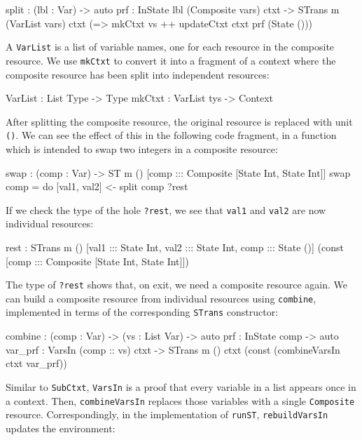 \small
\begin{code}
split : (lbl : Var) -> {auto prf : InState lbl (Composite vars) ctxt} ->
        STrans m (VarList vars) ctxt 
                 (\vs => mkCtxt vs ++ updateCtxt ctxt prf (State ()))
\end{code}
\normalsize

A \texttt{VarList} is a list of variable names, one for each resource
in the composite resource. We use \texttt{mkCtxt} to convert it into
a fragment of a context where the composite resource has been split into
independent resources:
  
\small
\begin{code}
VarList : List Type -> Type
mkCtxt : VarList tys -> Context
\end{code}
\normalsize

After splitting the composite resource, the original resource is replaced with
unit \texttt{()}. We can see the effect of this in the following code fragment,
in a function which is intended to swap two integers in a composite resource:

\small
\begin{code}
swap : (comp : Var) -> ST m () [comp ::: Composite [State Int, State Int]]
swap comp = do [val1, val2] <- split comp
               ?rest
\end{code}
\normalsize

If we check the type of the hole \texttt{?rest}, we see that \texttt{val1}
and \texttt{val2} are now individual resources:

\small
\begin{code}
rest : STrans m () [val1 ::: State Int, val2 ::: State Int, comp ::: State ()]
            (const [comp ::: Composite [State Int, State Int]])
\end{code}
\normalsize

The type of \texttt{?rest} shows that, on exit, we need a composite resource
again. We can build a composite resource from individual resources using
\texttt{combine}, implemented in terms of the corresponding \texttt{STrans}
constructor:

\small
\begin{code}
combine : (comp : Var) -> (vs : List Var) ->
          {auto prf : InState comp} -> {auto var_prf : VarsIn (comp :: vs) ctxt} ->
          STrans m () ctxt (const (combineVarsIn ctxt var_prf))
\end{code}
\normalsize

Similar to \texttt{SubCtxt}, \texttt{VarsIn} is a proof that every variable
in a list appears once in a context. Then, \texttt{combineVarsIn} replaces
those variables with a single \texttt{Composite} resource. Correspondingly,
in the implementation of \texttt{runST}, \texttt{rebuildVarsIn} updates the
environment:

